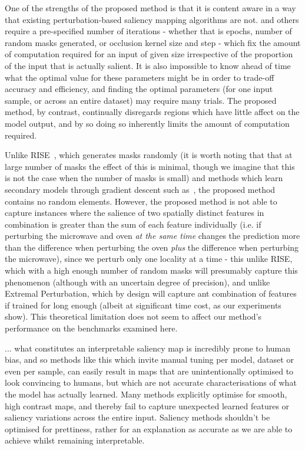 \documentclass{article} %
\begin{document}
One of the strengths of the proposed method is that it is content aware in a way that existing perturbation-based saliency mapping algorithms are not. \cite{Petsiuk2018-hc, Fong2019-vk, Fong2017-jg, zeilferg} and others require a pre-specified number of iterations - whether that is epochs, number of random masks generated, or occlusion kernel size and step - which fix the amount of computation required for an input of given size irrespective of the proportion of the input that is actually salient. It is also impossible to know ahead of time what the optimal value for these parameters might be in order to trade-off accuracy and efficiency, and finding the optimal parameters (for one input sample, or across an entire dataset) may require many trials. The proposed method, by contrast, continually disregards regions which have little affect on the model output, and by so doing so inherently limits the amount of computation required.

Unlike RISE~\cite{Petsiuk}, which generates masks randomly (it is worth noting that that at large number of masks the effect of this is minimal, though we imagine that this is not the case when the number of masks is small) and methods which learn secondary models through gradient descent such as~\cite{Fong2019-vk,Ribeiro2016-xl, Dabkowski2017-td}, the proposed method contains no random elements. However, the proposed method is not able to capture instances where the salience of two spatially distinct features in combination is greater than the sum of each feature individually (i.e. if perturbing the microwave and oven \emph{at the same time} changes the prediction more than the difference when perturbing the oven \emph{plus} the difference when perturbing the microwave), since we perturb only one locality at a time - this unlike RISE, which with a high enough number of random masks will presumably capture this phenomenon (although with an uncertain degree of precision), and unlike Extremal Perturbation, which by design will capture ant combination of features if trained for long enough (albeit at significant time cost, as our experiments show). This theoretical limitation does not seem to affect our method's performance on the benchmarks examined here.

... what constitutes an interpretable saliency map is incredibly prone to human bias, and so methods like this which invite manual tuning per model, dataset or even per sample, can easily result in maps that are unintentionally optimised to look convincing to humans, but which are not accurate characterisations of what the model has actually learned. Many methods explicitly optimise for smooth, high contrast maps, and thereby fail to capture unexpected learned features or saliency variations across the entire input. Saliency methods shouldn't be optimised for prettiness, rather for an explanation as accurate as we are able to achieve whilst remaining interpretable. 
\end{document}
